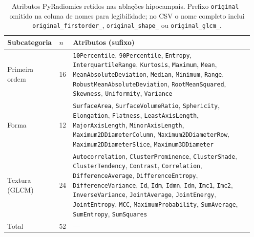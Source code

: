 \documentclass[review]{elsarticle}
\newcommand{\code}[1]{\texttt{#1}}
\begin{document}
\begin{table}[htbp]
	\centering
	\caption{Atributos PyRadiomics retidos nas ablações hipocampais. Prefixo \code{original\_} omitido na coluna de nomes para legibilidade; no CSV o nome completo inclui \code{original\_firstorder\_}, \code{original\_shape\_} ou \code{original\_glcm\_}.}
	\label{tab:pyradiomics-features}
	\small
	\begin{tabular}{@{}llp{}@{}}
		\toprule
		Subcategoria & $n$ & Atributos (sufixo) \\
		\midrule
		Primeira ordem
		& 16
		& \code{10Percentile}, \code{90Percentile}, \code{Entropy}, \code{InterquartileRange},
		\code{Kurtosis}, \code{Maximum}, \code{Mean}, \code{MeanAbsoluteDeviation},
		\code{Median}, \code{Minimum}, \code{Range}, \code{RobustMeanAbsoluteDeviation},
		\code{RootMeanSquared}, \code{Skewness}, \code{Uniformity}, \code{Variance} \\
		\addlinespace
		Forma
		& 12
		& \code{SurfaceArea}, \code{SurfaceVolumeRatio}, \code{Sphericity}, \code{Elongation},
		\code{Flatness}, \code{LeastAxisLength}, \code{MajorAxisLength}, \code{MinorAxisLength},
		\code{Maximum2DDiameterColumn}, \code{Maximum2DDiameterRow},
		\code{Maximum2DDiameterSlice}, \code{Maximum3DDiameter} \\
		\addlinespace
		Textura (GLCM)
		& 24
		& \code{Autocorrelation}, \code{ClusterProminence}, \code{ClusterShade},
		\code{ClusterTendency}, \code{Contrast}, \code{Correlation},
		\code{DifferenceAverage}, \code{DifferenceEntropy}, \code{DifferenceVariance},
		\code{Id}, \code{Idm}, \code{Idmn}, \code{Idn}, \code{Imc1}, \code{Imc2},
		\code{InverseVariance}, \code{JointAverage}, \code{JointEnergy},
		\code{JointEntropy}, \code{MCC}, \code{MaximumProbability},
		\code{SumAverage}, \code{SumEntropy}, \code{SumSquares} \\
		\midrule
		Total
		& 52
		& --- \\
		\bottomrule
	\end{tabular}
\end{table}
\end{document}
